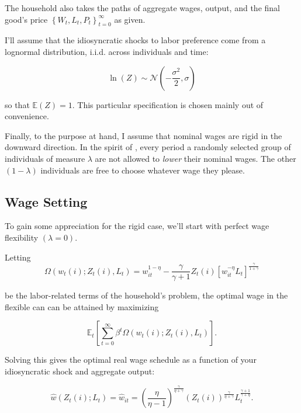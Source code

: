 \documentclass[12pt,a4paper]{scrartcl}            %
\begin{document}
The household also takes the paths of aggregate wages, output, and the final good's price $\left\{W_t, L_t, P_t \right\}_{t=0}^{\infty}$ as given.

I'll assume that the idiosyncratic shocks to labor preference come from a lognormal distribution, i.i.d. across individuals and time:

\begin{equation}
    \label{eq:shock_dist}
    \ln(Z) \sim \mathcal{N}\left(-\frac{\sigma^2}{2}, \sigma\right)
\end{equation}

so that $\mathbb{E}(Z) = 1$.
This particular specification is chosen mainly out of convenience.

Finally, to the purpose at hand, I assume that nominal wages are rigid in the downward direction.
In the spirit of \cite{calvo_1983}, every period a randomly selected group of individuals of measure $\lambda$ are not allowed to \emph{lower} their nominal wages.
The other $(1 - \lambda)$ individuals are free to choose whatever wage they please.
\subsection{Wage Setting}
\label{sub:wage_setting}

To gain some appreciation for the rigid case, we'll start with perfect wage flexibility $(\lambda = 0)$.

Letting
\begin{equation}
    \label{eq:labor_part}
    \Omega( w_t(i); Z_t(i), L_t ) = w_{it}^{1 - \eta} - \frac{\gamma}{\gamma + 1}Z_t(i)\left[ w_{it}^{-\eta}L_t \right]^{\frac{\gamma}{1 + \gamma}}
\end{equation}

be the labor-related terms of the household's problem, the optimal wage in the flexible can can be attained by maximizing

\begin{equation}
    \label{eq:labor_opt}
    \mathbb{E}_t\left[\sum_{t=0}^{\infty}\beta^t \Omega( w_t(i); Z_t(i), L_t ) \right].
\end{equation}

Solving this gives the optimal real wage schedule as a function of your idiosyncratic shock and aggregate output:

\begin{equation}
    \label{eq:flex}
    \hat{w}(Z_t(i); L_t) = \hat{w}_{it} = \left( \frac{\eta}{\eta - 1} \right)^{\frac{\gamma}{\eta + \gamma}}\left( Z_t(i) \right)^{\frac{\gamma}{\eta + \gamma}} L_t^{\frac{\gamma + 1}{\gamma + \eta}}.
\end{equation}
\end{document}
